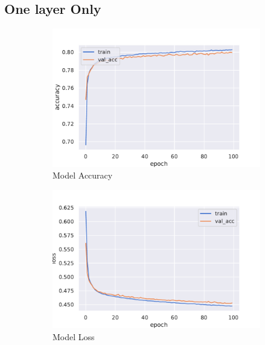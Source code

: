 \subsection{One layer Only}
\begin{figure}[H]
     \centering
     \begin{subfigure}[b]{0.3\textwidth}
         \centering
         \includegraphics[width=\textwidth]{figure_3/One_node_only_accuracy.pdf}
         \caption{Model Accuracy}
         \label{fig:y equals x}
     \end{subfigure}
     \hfill
     \begin{subfigure}[b]{0.3\textwidth}
         \centering
         \includegraphics[width=\textwidth]{figure_3/One_node_only_loss.pdf}
         \caption{Model Loss}
         \label{fig:three sin x}
     \end{subfigure}
     \hfill
     \begin{subfigure}[b]{0.3\textwidth}

\end{subfigure}
\end{figure}
